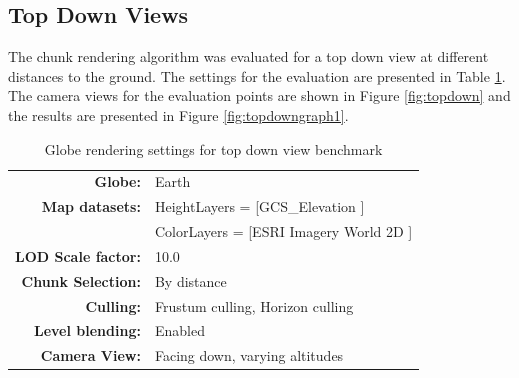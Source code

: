 \clearpage
\subsection{Top Down Views}
\FloatBarrier
The chunk rendering algorithm was evaluated for a top down view at different distances to the ground. The settings for the evaluation are presented in Table \ref{table:settingstopdown}. The camera views for the evaluation points are shown in Figure \ref{fig:topdown} and the results are presented in Figure \ref{fig:topdowngraph1}.
\begin{table}[h]
  \centering
  \caption[]{Globe rendering settings for top down view benchmark}
    \label{table:settingstopdown}
  \begin{tabular}{| r l |}
    \hline
      \textbf{Globe:}             & Earth \\
      \textbf{Map datasets:}      & HeightLayers = [GCS\_Elevation \cite{worldelevation3d}] \\
                                  & ColorLayers = [ESRI Imagery World 2D \cite{imageryworld2d}] \\
      \textbf{LOD Scale factor:}  & 10.0 \\
      \textbf{Chunk Selection:}    & By distance \\
      \textbf{Culling:}           & Frustum culling, Horizon culling \\
      \textbf{Level blending:}    & Enabled \\
      \textbf{Camera View:}       & Facing down, varying altitudes\\
    \hline
  \end{tabular}
\end{table}

